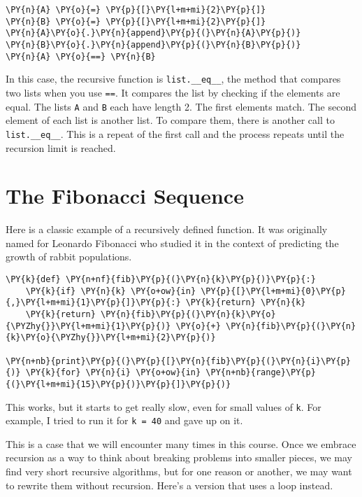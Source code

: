 \begin{Verbatim}[commandchars=\\\{\}]
\PY{n}{A} \PY{o}{=} \PY{p}{[}\PY{l+m+mi}{2}\PY{p}{]}
\PY{n}{B} \PY{o}{=} \PY{p}{[}\PY{l+m+mi}{2}\PY{p}{]}
\PY{n}{A}\PY{o}{.}\PY{n}{append}\PY{p}{(}\PY{n}{A}\PY{p}{)}
\PY{n}{B}\PY{o}{.}\PY{n}{append}\PY{p}{(}\PY{n}{B}\PY{p}{)}
\PY{n}{A} \PY{o}{==} \PY{n}{B}
\end{Verbatim}



In this case, the recursive function is \texttt{list.\_\_eq\_\_}, the method that compares two lists when you use \texttt{==}.  It compares the list by checking if the elements are equal.  The lists \texttt{A} and \texttt{B} each have length 2.  The first elements match.  The second element of each list is another list.  To compare them, there is another call to \texttt{list.\_\_eq\_\_}.  This is a repeat of the first call and the process repeats until the recursion limit is reached.

\section{The Fibonacci Sequence}


Here is a classic example of a recursively defined function.
It was originally named for Leonardo Fibonacci who studied it in the context of predicting the growth of rabbit populations.

\begin{Verbatim}[commandchars=\\\{\}]
\PY{k}{def} \PY{n+nf}{fib}\PY{p}{(}\PY{n}{k}\PY{p}{)}\PY{p}{:}
    \PY{k}{if} \PY{n}{k} \PY{o+ow}{in} \PY{p}{[}\PY{l+m+mi}{0}\PY{p}{,}\PY{l+m+mi}{1}\PY{p}{]}\PY{p}{:} \PY{k}{return} \PY{n}{k}
    \PY{k}{return} \PY{n}{fib}\PY{p}{(}\PY{n}{k}\PY{o}{\PYZhy{}}\PY{l+m+mi}{1}\PY{p}{)} \PY{o}{+} \PY{n}{fib}\PY{p}{(}\PY{n}{k}\PY{o}{\PYZhy{}}\PY{l+m+mi}{2}\PY{p}{)}

\PY{n+nb}{print}\PY{p}{(}\PY{p}{[}\PY{n}{fib}\PY{p}{(}\PY{n}{i}\PY{p}{)} \PY{k}{for} \PY{n}{i} \PY{o+ow}{in} \PY{n+nb}{range}\PY{p}{(}\PY{l+m+mi}{15}\PY{p}{)}\PY{p}{]}\PY{p}{)}
\end{Verbatim}



This works, but it starts to get really slow, even for small values of \texttt{k}.
For example, I tried to run it for \texttt{k = 40} and gave up on it.


This is a case that we will encounter many times in this course.
Once we embrace recursion as a way to think about breaking problems into smaller pieces, we may find very short recursive algorithms, but for one reason or another, we may want to rewrite them without recursion.
Here's a version that uses a loop instead.

